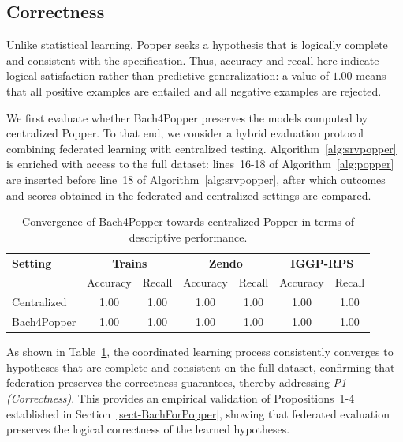 \subsection{Correctness}
Unlike statistical learning, Popper seeks a hypothesis that is logically complete and consistent with the specification.
Thus, accuracy and recall here indicate logical satisfaction rather than predictive generalization: a value of $1.00$ means that all positive examples are entailed and all negative examples are rejected.

We first evaluate whether Bach4Popper preserves the models computed by centralized Popper. To that end, we consider a hybrid evaluation protocol combining federated learning with centralized testing. 
Algorithm~\ref{alg:srvpopper} is enriched with access to the full dataset: lines~16-18 of Algorithm~\ref{alg:popper} are inserted before line~18 of Algorithm~\ref{alg:srvpopper}, after which outcomes and scores obtained in the federated and centralized settings are compared. 

\begin{table}[!t]
\centering
\small

\setlength{\tabcolsep}{6pt}
\begin{tabular}{l|cc|cc|cc}
\toprule
\textbf{Setting}
& \multicolumn{2}{c|}{\textbf{Trains}}
& \multicolumn{2}{c|}{\textbf{Zendo}}
& \multicolumn{2}{c}{\textbf{IGGP-RPS}} \\
& Accuracy & Recall
& Accuracy & Recall
& Accuracy & Recall \\
\midrule

Centralized
& 1.00  & 1.00 
& 1.00  & 1.00 
& 1.00  & 1.00   \\

Bach4Popper
& 1.00  & 1.00 
& 1.00  & 1.00 
& 1.00  & 1.00   \\
\bottomrule
\end{tabular}
\vspace{2mm}
\caption{Convergence of Bach4Popper towards centralized Popper in terms of descriptive performance.}
\label{tab:convergence}
\end{table}

As shown in Table~\ref{tab:convergence}, the coordinated learning process consistently converges to hypotheses that are complete and consistent on the full dataset, confirming that federation preserves the correctness guarantees,
thereby addressing \textit{P1 (Correctness)}. This provides an empirical validation of Propositions~1-4 established in Section~\ref{sect-BachForPopper}, showing that federated evaluation preserves the logical correctness of the learned hypotheses.



